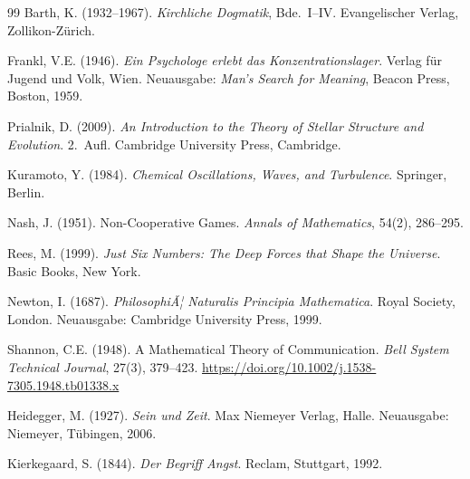 ﻿\documentclass[a4paper,12pt]{article}
\theoremstyle{definition}
\begin{document}
\begin{thebibliography}{99}
Barth, K. (1932--1967). \textit{Kirchliche Dogmatik}, Bde.~I--IV. Evangelischer Verlag, Zollikon-Zürich.

Frankl, V.E. (1946). \textit{Ein Psychologe erlebt das Konzentrationslager}. Verlag für Jugend und Volk, Wien. Neuausgabe: \textit{Man's Search for Meaning}, Beacon Press, Boston, 1959.

Prialnik, D. (2009). \textit{An Introduction to the Theory of Stellar Structure and Evolution}. 2.~Aufl. Cambridge University Press, Cambridge.

Kuramoto, Y. (1984). \textit{Chemical Oscillations, Waves, and Turbulence}. Springer, Berlin.

Nash, J. (1951). Non-Cooperative Games. \textit{Annals of Mathematics}, 54(2), 286--295.

Rees, M. (1999). \textit{Just Six Numbers: The Deep Forces that Shape the Universe}. Basic Books, New York.

Newton, I. (1687). \textit{PhilosophiÃ¦ Naturalis Principia Mathematica}. Royal Society, London. Neuausgabe: Cambridge University Press, 1999.

Shannon, C.E. (1948). A Mathematical Theory of Communication. \textit{Bell System Technical Journal}, 27(3), 379--423. \url{https://doi.org/10.1002/j.1538-7305.1948.tb01338.x}

Heidegger, M. (1927). \textit{Sein und Zeit}. Max Niemeyer Verlag, Halle. Neuausgabe: Niemeyer, Tübingen, 2006.

Kierkegaard, S. (1844). \textit{Der Begriff Angst}. Reclam, Stuttgart, 1992.

\end{thebibliography}
\end{document}
